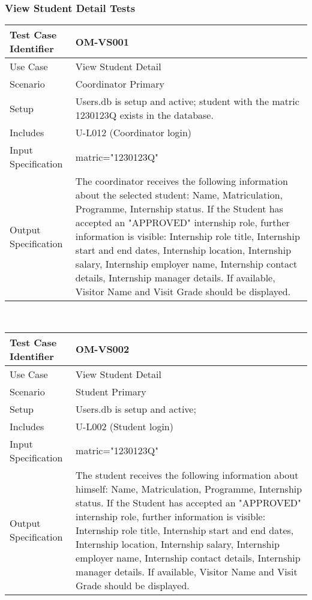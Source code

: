 \documentclass{l3deliverable}
\begin{document}
\subsubsection{View Student Detail Tests}
\begin{tabular}{lp{10cm}}
\hline 
\textbf{Test Case Identifier} & OM-VS001\tabularnewline
\hline 
\hline 
Use Case & View Student Detail \tabularnewline
\hline 
Scenario & Coordinator Primary \tabularnewline
\hline 
Setup & Users.db is setup and active; student with the matric 1230123Q exists in the database. \tabularnewline
\hline 
Includes & U-L012 (Coordinator login) \tabularnewline
\hline 
Input Specification & matric="1230123Q" \tabularnewline
\hline 
Output Specification &  The coordinator receives the following information about the selected student: Name, Matriculation, Programme, Internship status. If the Student has accepted an "APPROVED" internship role, further information is visible: Internship role title, Internship start and end dates, Internship location, Internship salary, Internship employer name, Internship contact details, Internship manager details. If available, Visitor Name and Visit Grade should be displayed.\tabularnewline
\hline 
\end{tabular}\\


\begin{tabular}{lp{10cm}}
\hline 
\textbf{Test Case Identifier} & OM-VS002\tabularnewline
\hline 
\hline 
Use Case & View Student Detail \tabularnewline
\hline 
Scenario & Student Primary \tabularnewline
\hline 
Setup & Users.db is setup and active; \tabularnewline
\hline 
Includes & U-L002 (Student login) \tabularnewline
\hline 
Input Specification & matric="1230123Q" \tabularnewline
\hline 
Output Specification &  The student receives the following information about himself: Name, Matriculation, Programme, Internship status. If the Student has accepted an "APPROVED" internship role, further information is visible: Internship role title, Internship start and end dates, Internship location, Internship salary, Internship employer name, Internship contact details, Internship manager details. If available, Visitor Name and Visit Grade should be displayed.\tabularnewline
\hline 
\end{tabular}\\
\end{document}
